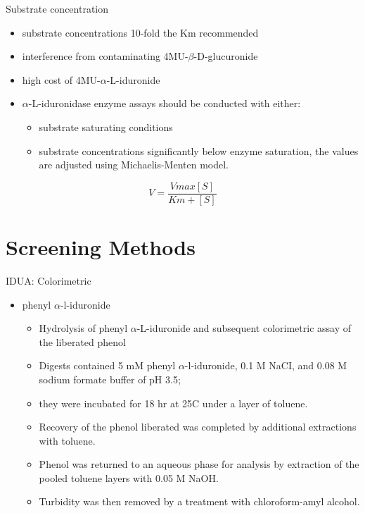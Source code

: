 \documentclass[presentation, smaller]{beamer}
\begin{document}
\begin{frame}[label={sec:org92b3c7c}]{Substrate concentration}
\begin{itemize}
\item substrate concentrations 10-fold the Km recommended
\item interference from contaminating 4MU-\(\beta\)-D-glucuronide
\item high cost of 4MU-\(\alpha\)-L-iduronide
\item \(\alpha\)-L-iduronidase enzyme assays should be conducted with either:
\begin{itemize}
\item substrate saturating conditions
\item substrate concentrations significantly below enzyme saturation,
the values are adjusted using Michaelis-Menten model.
\end{itemize}
\end{itemize}

\[ 
V  = \frac{Vmax[S]}{Km + [S]}
\]
\end{frame}


\section{Screening Methods}
\label{sec:org326719c}

\begin{frame}[label={sec:org384cfe0}]{IDUA: Colorimetric}
\begin{itemize}
\item phenyl \(\alpha\)-l-iduronide
\begin{itemize}
\item Hydrolysis of phenyl \(\alpha\)-L-iduronide and subsequent
colorimetric assay of the liberated phenol
\item Digests contained 5 mM phenyl \(\alpha\)-l-iduronide, 0.1 M NaCI,
and 0.08 M sodium formate buffer of pH 3.5;
\item they were incubated for 18 hr at 25\degree C under a layer of \alert{toluene}.
\item Recovery of the phenol liberated was completed by additional extractions with \alert{toluene}.
\item Phenol was returned to an aqueous phase for analysis by extraction of the pooled \alert{toluene} layers with 0.05 M NaOH.
\item Turbidity was then removed by a treatment with \alert{chloroform-amyl alcohol}.
\end{itemize}
\end{itemize}
\end{frame}
\end{document}
